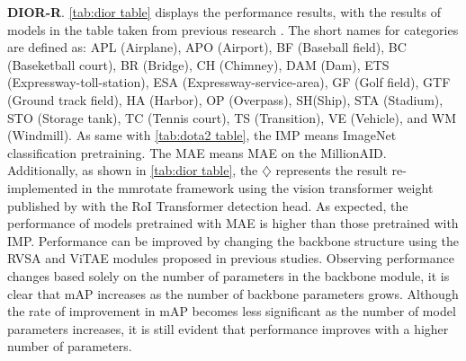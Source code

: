 \textbf{DIOR-R}. \autoref{tab:dior table} displays the performance results, with the results of models in the table taken from previous research \cite{wang2022advancing}. {The short names for categories are defined as: APL (Airplane), APO (Airport), BF (Baseball field), BC (Baseketball court), BR (Bridge), CH (Chimney), DAM (Dam), ETS (Expressway-toll-station), ESA (Expressway-service-area), GF (Golf field), GTF (Ground track field), HA (Harbor), OP (Overpass), SH(Ship), STA (Stadium), STO (Storage tank), TC (Tennis court), TS (Transition), VE (Vehicle), and WM (Windmill). As same with \autoref{tab:dota2 table}, the IMP means ImageNet classification pretraining. The MAE means MAE on the MillionAID.} Additionally, as shown in \autoref{tab:dior table}, the $\diamondsuit$ represents the result re-implemented in the mmrotate framework using the vision transformer weight published by \cite{wang2022advancing} with the RoI Transformer detection head. As expected, the performance of models pretrained with MAE is higher than those pretrained with IMP. Performance can be improved by changing the backbone structure using the RVSA \cite{wang2022advancing} and ViTAE \cite{xu2021vitae} modules proposed in previous studies. Observing performance changes based solely on the number of parameters in the backbone module, it is clear that mAP increases as the number of backbone parameters grows. Although the rate of improvement in mAP becomes less significant as the number of model parameters increases, it is still evident that performance improves with a higher number of parameters.

